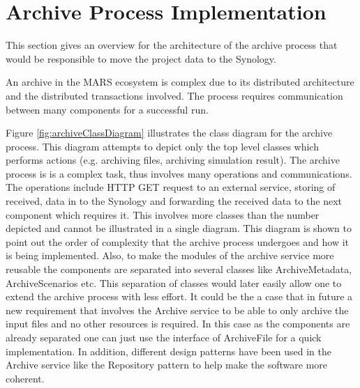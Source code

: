 \section{Archive Process Implementation}
This section gives an overview for the architecture of the archive process that would be responsible
to move the project data to the Synology. 

An archive in the MARS ecosystem is complex due to its distributed architecture and the distributed transactions involved. The process requires communication between many components for a 
successful run. %

Figure \ref{fig:archiveClassDiagram} illustrates the class diagram for the archive process. This diagram attempts to depict only the top level classes
which performs actions (e.g. archiving files, archiving simulation result). The archive process is is a complex 
task, thus involves many operations and communications. The operations include HTTP GET request to an external service, storing of received,
data in to the Synology and forwarding the received data to the next component which requires it. This involves more classes than the number depicted
and cannot be illustrated in a single diagram. This diagram is shown to point out the order of complexity that the archive process undergoes and how it is being
implemented. Also, to make the modules of the archive service more reusable the components are separated into several classes
like ArchiveMetadata, ArchiveScenarios etc. This separation
of classes would later easily allow one to extend the archive process with less effort. It could be the a case that in future a new requirement
that involves the Archive service to be able to only archive
the input files and no other resources is required. In this case as the components are already separated one can just use the interface of ArchiveFile for a quick implementation. 
In addition, different design patterns have been used
in the Archive service like the Repository pattern \cite{repo} to help make the software more coherent.
 

